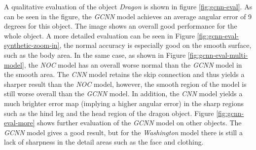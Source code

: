 A qualitative evaluation of the object \textit{Dragon} is shown in figure \ref{fig:gcnn-eval}. As can be seen in the figure, the \textit{GCNN} model achieves an average angular error of 9 degrees for this object. The image shows an overall good performance for the whole object. A more detailed evaluation can be seen in Figure \ref{fig:gcnn-eval-synthetic-zoom-in}, the normal accuracy is especially good on the smooth surface, such as the body area. In the same case, as shown in Figure \ref{fig:gcnn-eval-multi-model}, the \textit{NOC} model has an overall worse normal than the \textit{GCNN} model in the smooth area. The \textit{CNN} model retains the skip connection and thus yields a sharper result than the \textit{NOC} model, however, the smooth region of the model is still worse overall than the \textit{GCNN} model. In addition, the \textit{CNN} model yields a much brighter error map (implying a higher angular error) in the sharp regions such as the hind leg and the head region of the dragon object. Figure \ref{fig:gcnn-eval-more} shows further evaluation of the \textit{GCNN} model on other objects.
The \textit{GCNN} model gives a good result, but for the \textit{Washington} model there is still a lack of sharpness in the detail areas such as the face and clothing. 



